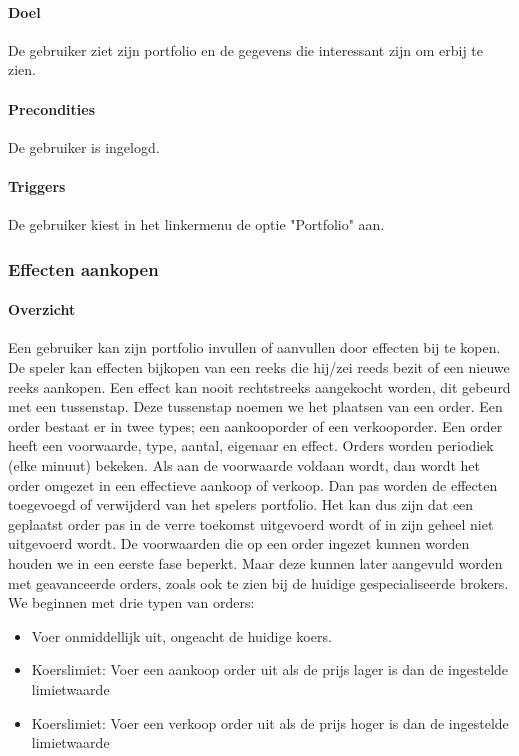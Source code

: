 \paragraph{Doel} De gebruiker ziet zijn portfolio en de gegevens die interessant zijn om erbij te zien.
\paragraph{Precondities} De gebruiker is ingelogd.
\paragraph{Triggers} De gebruiker kiest in het linkermenu de optie "Portfolio" aan.



\subsubsection{Effecten aankopen}

\paragraph{Overzicht}Een gebruiker kan zijn portfolio invullen of aanvullen door effecten bij te kopen. De speler kan effecten bijkopen van een reeks die hij/zei reeds bezit of een nieuwe reeks aankopen. Een effect kan nooit rechtstreeks aangekocht worden, dit gebeurd met een tussenstap. Deze tussenstap noemen we het plaatsen van een order. Een order bestaat er in twee types; een aankooporder of een verkooporder. Een order heeft een voorwaarde, type, aantal, eigenaar en effect. Orders worden periodiek (elke minuut) bekeken. Als aan de voorwaarde voldaan wordt, dan wordt het order omgezet in een effectieve aankoop of verkoop. Dan pas worden de effecten toegevoegd of verwijderd van het spelers portfolio. Het kan dus zijn dat een geplaatst order pas in de verre toekomst uitgevoerd wordt of in zijn geheel niet uitgevoerd wordt. De voorwaarden die op een order ingezet kunnen worden houden we in een eerste fase beperkt. Maar deze kunnen later aangevuld worden met geavanceerde orders, zoals ook te zien bij de huidige gespecialiseerde brokers. We beginnen met drie typen van orders:

\begin{itemize}
 \item Voer onmiddellijk uit, ongeacht de huidige koers.
 \item Koerslimiet: Voer een aankoop order uit als de prijs lager is dan de ingestelde limietwaarde
 \item Koerslimiet: Voer een verkoop order uit als de prijs hoger is dan de ingestelde limietwaarde
\end{itemize}

